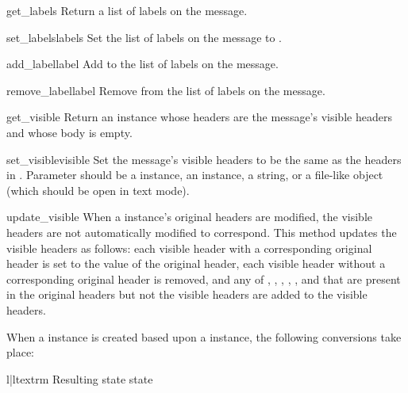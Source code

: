 \begin{methoddesc}{get_labels}{}
Return a list of labels on the message.
\end{methoddesc}

\begin{methoddesc}{set_labels}{labels}
Set the list of labels on the message to .
\end{methoddesc}

\begin{methoddesc}{add_label}{label}
Add  to the list of labels on the message.
\end{methoddesc}

\begin{methoddesc}{remove_label}{label}
Remove  from the list of labels on the message.
\end{methoddesc}

\begin{methoddesc}{get_visible}{}
Return an  instance whose headers are the message's visible
headers and whose body is empty.
\end{methoddesc}

\begin{methoddesc}{set_visible}{visible}
Set the message's visible headers to be the same as the headers in
. Parameter  should be a  instance, an
 instance, a string, or a file-like object (which
should be open in text mode).
\end{methoddesc}

\begin{methoddesc}{update_visible}{}
When a  instance's original headers are modified, the
visible headers are not automatically modified to correspond. This method
updates the visible headers as follows: each visible header with a
corresponding original header is set to the value of the original header, each
visible header without a corresponding original header is removed, and any of
, , , ,
, and  that are present in the original
headers but not the visible headers are added to the visible headers.
\end{methoddesc}

When a  instance is created based upon a
 instance, the following conversions take place:

\begin{tableii}{l|l}{textrm}
    {Resulting state}{ state}
\end{tableii}

